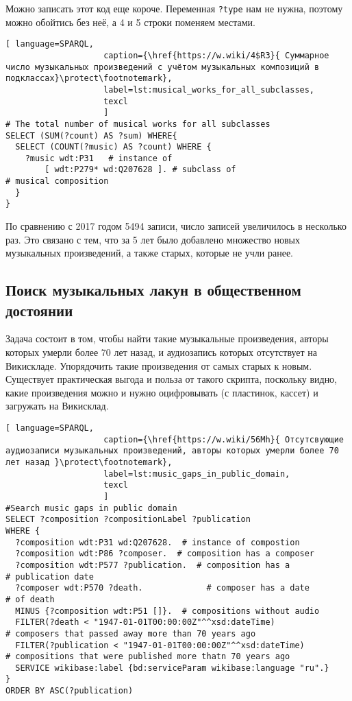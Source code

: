 Можно записать этот код еще короче. Переменная \lstinline|?type| нам не нужна, поэтому можно обойтись без неё, а 4 и 5 строки поменяем местами.

\begin{lstlisting}[ language=SPARQL,
                    caption={\href{https://w.wiki/4$R3}{ Суммарное число музыкальных произведений с учётом музыкальных композиций в подклассах}\protect\footnotemark},
                    label=lst:musical_works_for_all_subclasses,
                    texcl 
                    ]
# The total number of musical works for all subclasses 
SELECT (SUM(?count) AS ?sum) WHERE{
  SELECT (COUNT(?music) AS ?count) WHERE {
    ?music wdt:P31   # instance of
        [ wdt:P279* wd:Q207628 ]. # subclass of
# musical composition
  }
}
\end{lstlisting}%

По сравнению с 2017 годом \num{5494} записи, число записей увеличилось в несколько раз. Это связано с тем, что за 5 лет было добавлено множество новых музыкальных произведений, а также старых, которые не учли ранее.


\subsection{Поиск музыкальных лакун в общественном достоянии}
Задача состоит в том, чтобы найти такие музыкальные произведения, авторы которых умерли более 70 лет назад, и аудиозапись которых отсутствует на Викискладе. Упорядочить такие произведения от самых старых к новым. Существует практическая выгода и польза от такого скрипта, поскольку видно, какие произведения можно и нужно оцифровывать (с пластинок, кассет) и загружать на Викисклад.

\begin{lstlisting}[ language=SPARQL,
                    caption={\href{https://w.wiki/56Mh}{ Отсутсвующие аудиозаписи музыкальных произведений, авторы которых умерли более 70 лет назад }\protect\footnotemark},
                    label=lst:music_gaps_in_public_domain,
                    texcl 
                    ]
#Search music gaps in public domain
SELECT ?composition ?compositionLabel ?publication
WHERE {
  ?composition wdt:P31 wd:Q207628.  # instance of compostion
  ?composition wdt:P86 ?composer.  # composition has a composer
  ?composition wdt:P577 ?publication.  # composition has a
# publication date
  ?composer wdt:P570 ?death.             # composer has a date
# of death
  MINUS {?composition wdt:P51 []}.  # compositions without audio 
  FILTER(?death < "1947-01-01T00:00:00Z"^^xsd:dateTime)  
# composers that passed away more than 70 years ago
  FILTER(?publication < "1947-01-01T00:00:00Z"^^xsd:dateTime)  
# compositions that were published more thatn 70 years ago
  SERVICE wikibase:label {bd:serviceParam wikibase:language "ru".}
}
ORDER BY ASC(?publication)
\end{lstlisting}%




